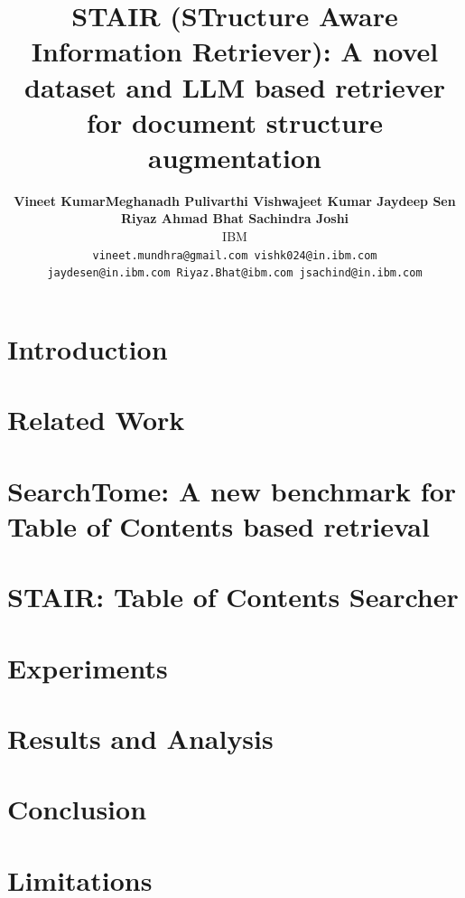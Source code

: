 \documentclass[11pt]{article}
\title{STAIR (STructure Aware Information Retriever): A novel dataset and LLM based retriever for document structure augmentation}
\author{
  \normalsize\textbf{Vineet Kumar\footnotemark[1] \quad Meghanadh Pulivarthi \quad Vishwajeet Kumar \quad Jaydeep Sen} \\
  \normalsize\textbf{Riyaz Ahmad Bhat \quad Sachindra Joshi} \\
  \normalsize IBM \\
  \normalsize\texttt{vineet.mundhra@gmail.com \quad vishk024@in.ibm.com} \\
  \normalsize\texttt{jaydesen@in.ibm.com \quad Riyaz.Bhat@ibm.com \quad jsachind@in.ibm.com}
}
\newcommand{\sys}{{\textbf{STAIR}}}
\newcommand{\ben}{{\textbf{SearchTome}}}
\renewcommand{\thefootnote}{\fnsymbol{footnote}}
\begin{document}
\maketitle


\renewcommand{\thefootnote}{\arabic{footnote}}  %

\begin{abstract}

\end{abstract}

\section{Introduction}
\label{intro}


\section{Related Work}
\label{sec:relatedwork}


\section{{\ben}: A new benchmark for Table of Contents based retrieval}
\label{sec:benchmark}


\section{{\sys}: Table of Contents Searcher}
\label{sec:system}


\section{Experiments}
\label{sec:expt}


\section{Results and Analysis}
\label{sec:results}


\section{Conclusion}
\label{sec:conclusion}


\section{Limitations}







\end{document}
